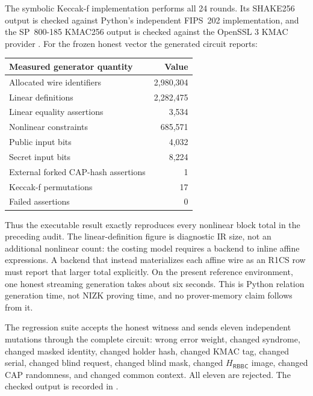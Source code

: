\documentclass[11pt]{article}
\newcommand{\RBBC}{\mathsf{RBBC}}
\begin{document}
The symbolic Keccak-f implementation performs all 24 rounds.  Its SHAKE256
output is checked against Python's independent FIPS~202 implementation, and
the SP~800-185 KMAC256 output is checked against the OpenSSL 3 KMAC provider
\cite{fips202,sp800185}.
For the frozen honest vector the generated circuit reports:
\begin{center}
\begin{tabular}{lr}
\toprule
Measured generator quantity & Value\\
\midrule
Allocated wire identifiers & 2,980,304\\
Linear definitions & 2,282,475\\
Linear equality assertions & 3,534\\
Nonlinear constraints & 685,571\\
Public input bits & 4,032\\
Secret input bits & 8,224\\
External forked CAP-hash assertions & 1\\
Keccak-f permutations & 17\\
Failed assertions & 0\\
\bottomrule
\end{tabular}
\end{center}
Thus the executable result exactly reproduces every nonlinear block total in
the preceding audit.  The linear-definition figure is diagnostic IR size, not
an additional nonlinear count: the costing model requires a backend to inline
affine expressions.  A backend that instead materializes each affine wire as
an R1CS row must report that larger total explicitly.  On the present reference
environment, one honest streaming generation takes about six seconds.  This is Python relation
generation time, not NIZK proving time, and no prover-memory claim follows from
it.

The regression suite accepts the honest witness and sends eleven independent
mutations through the complete circuit: wrong error weight, changed syndrome,
changed masked identity, changed holder hash, changed KMAC tag, changed serial,
changed blind request, changed blind mask, changed $H_{\RBBC}$ image, changed
CAP randomness, and changed common context.  All eleven are rejected.
The checked output is recorded in
.
\end{document}
